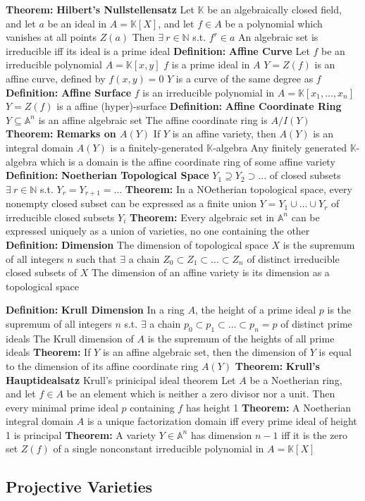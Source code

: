 \documentclass[14pt]{extarticle}
\def\Definition{{\color{blue} \textbf{Definition:} }}
\def\Theorem{{\color{red} \textbf{Theorem:} }}
\begin{document}
\begin{outline}
		\1	\Theorem \textbf{Hilbert's Nullstellensatz}
			\2	Let $\mathbb{K}$ be an algebraically closed field, and let $a$ be
					an ideal in $A = \mathbb{K}[X]$, and let $f \in A$ be a polynomial
					which vanishes at all points $Z(a)$
			\2	Then $\exists~r \in \mathbb{N}$ s.t. $f^r \in a$
			\2	An algebraic set is irreducible iff its ideal is a prime ideal
		\1	\Definition \textbf{Affine Curve}
			\2	Let $f$ be an irreducible polynomial $A = \mathbb{K}[x,y]$
			\2	$f$ is a prime ideal in $A$
			\2	$Y = Z(f)$ is an affine curve, defined by $f(x,y) = 0$
			\2	$Y$ is a curve of the same degree as $f$
		\1	\Definition \textbf{Affine Surface}
			\2	$f$ is an irreducible polynomial in $A = \mathbb{K}[x_1,...,x_n]$
			\2	$Y = Z(f)$ is a affine (hyper)-surface
		\1	\Definition \textbf{Affine Coordinate Ring}
			\2	$Y \subseteq \mathbb{A}^n$ is an affine algebraic set
			\2	The affine coordinate ring is $A/I(Y)$
		\1	\Theorem \textbf{Remarks on $A(Y)$}
			\2	If $Y$ is an affine variety, then $A(Y)$ is an integral domain
			\2	$A(Y)$ is a finitely-generated $\mathbb{K}$-algebra
			\2	Any finitely generated $\mathbb{K}$-algebra which is a domain is the 
					affine coordinate ring of some affine variety
		\1	\Definition \textbf{Noetherian Topological Space}
			\2	$Y_1 \supseteq Y_2 \supset ...$ of closed subsets
			\2	$\exists~r \in \mathbb{N}$ s.t. $Y_r = Y_{r+1} = ...$
		\1	\Theorem In a NOetherian topological space, every nonempty closed subset
				can be expressed as a finite union $Y = Y_1 \cup ... \cup Y_r$ of 
				irreducible closed subsets $Y_i$
		\1	\Theorem Every algebraic set in $\mathbb{A}^n$ can be expressed uniquely
				as a union of varieties, no one containing the other
		\1	\Definition \textbf{Dimension}
			\2	The dimension of topological space $X$ is the supremum of all integers
					$n$ such that $\exists$ a chain $Z_0 \subset Z_1 \subset ... \subset Z_n$
					of distinct irreducible closed subsets of $X$
			\2	The dimension of an affine variety is its dimension as a topological space

		\1	\Definition \textbf{Krull Dimension}
			\2	In a ring $A$, the height of a prime ideal $p$ is the supremum of all
					integers $n$ s.t. $\exists$ a chain $p_0 \subset p_1 \subset ... \subset p_n = p$
					of distinct prime ideals
			\2	The Krull dimension of $A$ is the supremum of the heights of all prime
					ideals
		\1	\Theorem If $Y$ is an affine algebraic set, then the dimension of $Y$
				is equal to the dimension of its affine coordinate ring $A(Y)$
		\1	\Theorem \textbf{Krull's Hauptidealsatz}
			\2	Krull's prinicipal ideal theorem
			\2	Let $A$ be a Noetherian ring, and let $f \in A$ be an element which
					is neither a zero divisor nor a unit.  Then every minimal prime ideal
					$p$ containing $f$ has height 1
		\1	\Theorem A Noetherian integral domain $A$ is a unique factorization domain
				iff every prime ideal of height 1 is principal
		\1	\Theorem A variety $Y \in \mathbb{A}^n$ has dimension $n-1$ iff it is
				the zero set $Z(f)$ of a single nonconstant irreducible polynomial in
				$A = \mathbb{K}[X]$
		\subsection*{Projective Varieties}	
	\end{outline}
\end{document}
